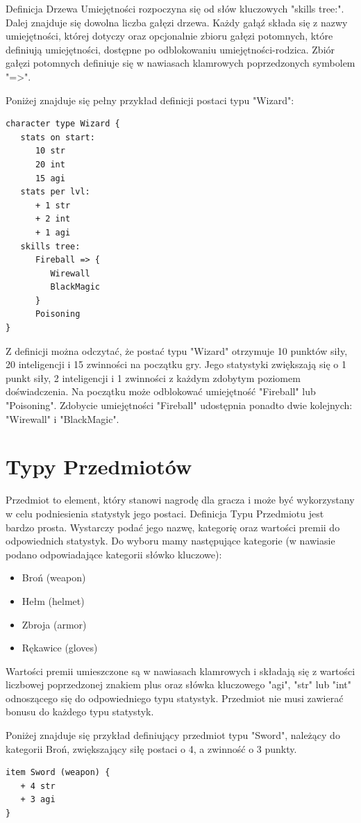 \documentclass	{xmgr}
\begin{document}
Definicja Drzewa Umiejętności rozpoczyna się od słów kluczowych "skills tree:". Dalej znajduje się dowolna liczba gałęzi drzewa.
Każdy gałąź składa się z nazwy umiejętności, której dotyczy oraz opcjonalnie zbioru gałęzi potomnych, które definiują umiejętności, dostępne po odblokowaniu umiejętności-rodzica.
Zbiór gałęzi potomnych definiuje się w nawiasach klamrowych poprzedzonych symbolem "=>". 

Poniżej znajduje się pełny przykład definicji postaci typu "Wizard":
\begin{lstlisting}
character type Wizard {
   stats on start:
      10 str
      20 int
      15 agi
   stats per lvl:
      + 1 str
      + 2 int
      + 1 agi
   skills tree:
      Fireball => {
         Wirewall
         BlackMagic
      }
      Poisoning
}
\end{lstlisting}
Z definicji można odczytać, że postać typu "Wizard" otrzymuje 10 punktów siły, 20 inteligencji i 15 zwinności na początku gry.
Jego statystyki zwiększają się o 1 punkt siły, 2 inteligencji i 1 zwinności z każdym zdobytym poziomem doświadczenia.
Na początku może odblokować umiejętność "Fireball" lub "Poisoning". Zdobycie umiejętności "Fireball" udostępnia ponadto dwie kolejnych: "Wirewall" i "BlackMagic". 

\section{Typy Przedmiotów}
Przedmiot to element, który stanowi nagrodę dla gracza i może być wykorzystany w celu podniesienia statystyk jego postaci. Definicja Typu Przedmiotu jest bardzo prosta. Wystarczy podać jego nazwę, kategorię oraz wartości premii do odpowiednich statystyk.
Do wyboru mamy następujące kategorie (w nawiasie podano odpowiadające kategorii słówko kluczowe):
\begin{itemize}
	\item Broń (weapon)
	\item Hełm (helmet)
	\item Zbroja (armor)
	\item Rękawice (gloves)
\end{itemize}
Wartości premii umieszczone są w nawiasach klamrowych i składają się z wartości liczbowej poprzedzonej znakiem plus oraz słówka kluczowego "agi", "str" lub "int" odnoszącego się do odpowiedniego typu statystyk. Przedmiot nie musi zawierać bonusu do każdego typu statystyk.

Poniżej znajduje się przykład definiujący przedmiot typu "Sword", należący do kategorii Broń, zwiększający siłę postaci o 4, a zwinność o 3 punkty.
\begin{lstlisting}
item Sword (weapon) {
   + 4 str
   + 3 agi
}
\end{lstlisting}
\end{document}

